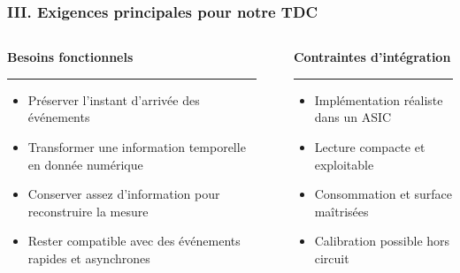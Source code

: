 \documentclass[aspectratio=169,10pt]{beamer}
\newcommand{\lead}[1]{\relax}
\begin{document}
\begin{frame}
  \frametitle{III. Exigences principales pour notre TDC}
  \lead{Le choix d'architecture vient d'un ensemble de besoins de mesure et de contraintes ASIC.}

  \vspace{0.20cm}
  \begin{columns}[T,totalwidth=0.94\textwidth]
    \begin{column}{0.45\textwidth}
      {\bfseries\color{navy2}Besoins fonctionnels}
      \vspace{0.08cm}
      {\color{line}\rule{\linewidth}{0.35pt}}
      \small
      \begin{itemize}
        \item Préserver l'instant d'arrivée des événements
        \item Transformer une information temporelle en donnée numérique
        \item Conserver assez d'information pour reconstruire la mesure
        \item Rester compatible avec des événements rapides et asynchrones
      \end{itemize}
    \end{column}
    \begin{column}{0.04\textwidth}
      \centering
      \vspace{0.14cm}
      {\color{line!70}\rule{0.35pt}{3.02cm}}
    \end{column}
    \begin{column}{0.45\textwidth}
      {\bfseries\color{navy2}Contraintes d'intégration}
      \vspace{0.08cm}
      {\color{line}\rule{\linewidth}{0.35pt}}
      \small
      \begin{itemize}
        \item Implémentation réaliste dans un ASIC
        \item Lecture compacte et exploitable
        \item Consommation et surface maîtrisées
        \item Calibration possible hors circuit
      \end{itemize}
    \end{column}
  \end{columns}

  \vspace{0.26cm}
  \begin{center}
  \end{center}


\end{frame}
\end{document}
